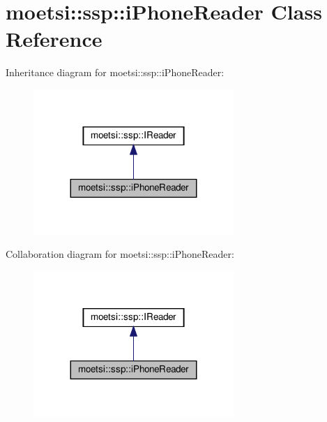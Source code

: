 \hypertarget{classmoetsi_1_1ssp_1_1iPhoneReader}{}\section{moetsi\+:\+:ssp\+:\+:i\+Phone\+Reader Class Reference}
\label{classmoetsi_1_1ssp_1_1iPhoneReader}


Inheritance diagram for moetsi\+:\+:ssp\+:\+:i\+Phone\+Reader\+:\nopagebreak
\begin{figure}[H]
\begin{center}
\leavevmode
\includegraphics[width=215pt]{classmoetsi_1_1ssp_1_1iPhoneReader__inherit__graph}
\end{center}
\end{figure}


Collaboration diagram for moetsi\+:\+:ssp\+:\+:i\+Phone\+Reader\+:\nopagebreak
\begin{figure}[H]
\begin{center}
\leavevmode
\includegraphics[width=215pt]{classmoetsi_1_1ssp_1_1iPhoneReader__coll__graph}
\end{center}
\end{figure}
